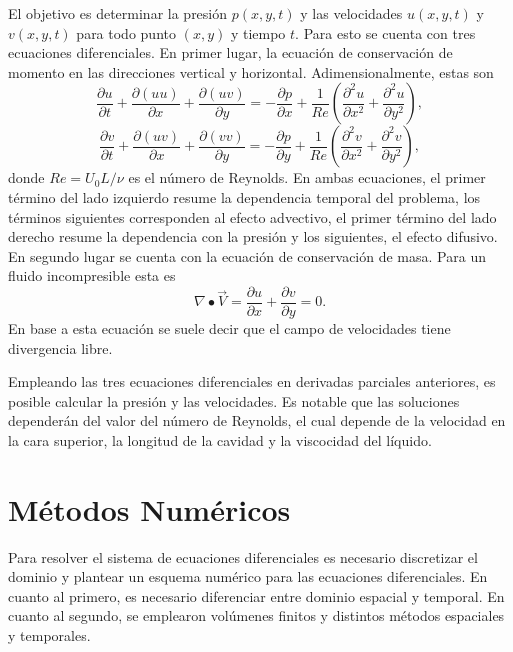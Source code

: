 \documentclass[aps,prb,twocolumn,superscriptaddress,floatfix,longbibliography,10pt]{revtex4-2}
\newif\ifptitle
\newif\ifpnumber
\newcounter{para}
\newcommand\ptitle[1]{\par\refstepcounter{para}
{\ifpnumber{\noindent\textcolor{lightgray}{\textbf{\thepara}}\indent}\fi}
{\ifptitle{\textbf{[{#1}]}}\fi}}
\begin{document}
El objetivo es determinar la presión $p(x,y,t)$ y las velocidades $u(x,y,t)$ y $v(x,y,t)$ para todo punto $(x,y)$ y tiempo $t$. Para esto se cuenta con tres ecuaciones diferenciales. En primer lugar, la ecuación de conservación de momento en las direcciones vertical y horizontal. Adimensionalmente, estas son
\begin{equation}
  \frac{\partial u}{\partial t} + \frac{\partial (u u)}{\partial x} + \frac{\partial (u v)}{\partial y} = - \frac{\partial p}{\partial x} + \frac{1}{Re} \left ( \frac{\partial^2 u}{\partial x^2} + \frac{\partial^2 u}{\partial y^2} \right ),
  \label{eq:momento_x}
\end{equation}
\begin{equation}
  \frac{\partial v}{\partial t} + \frac{\partial (u v)}{\partial x} + \frac{\partial (v v)}{\partial y} = - \frac{\partial p}{\partial y} + \frac{1}{Re} \left ( \frac{\partial^2 v}{\partial x^2} + \frac{\partial^2 v}{\partial y^2} \right ),
  \label{eq:momento_y}
\end{equation}
donde $Re = U_0L/\nu$ es el número de Reynolds. En ambas ecuaciones, el primer término del lado izquierdo resume la dependencia temporal del problema, los términos siguientes corresponden al efecto advectivo, el primer término del lado derecho resume la dependencia con la presión y los siguientes, el efecto difusivo. En segundo lugar se cuenta con la ecuación de conservación de masa. Para un fluido incompresible esta es
\begin{equation}
  \nabla \bullet \vec{V} = \frac{\partial u}{\partial x} + \frac{\partial v}{\partial y} = 0.
  \label{eq:cons_masa}
\end{equation}
En base a esta ecuación se suele decir que el campo de velocidades tiene divergencia libre.

\ptitle{Resumen}

Empleando las tres ecuaciones diferenciales en derivadas parciales anteriores, es posible calcular la presión y las velocidades. Es notable que las soluciones dependerán del valor del número de Reynolds, el cual depende de la velocidad en la cara superior, la longitud de la cavidad y la viscocidad del líquido.

\section{Métodos Numéricos}

\ptitle{Resumen}
Para resolver el sistema de ecuaciones diferenciales es necesario discretizar el dominio y plantear un esquema numérico para las ecuaciones diferenciales. En cuanto al primero, es necesario diferenciar entre dominio espacial y temporal. En cuanto al segundo, se emplearon volúmenes finitos y distintos métodos espaciales y temporales.
\end{document}
